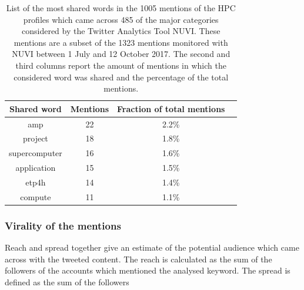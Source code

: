 \begin{table}[t]
 \begin{center}
  \begin{tabular}{cccc}
   \hline 
   \hline
   Shared word & Mentions & Fraction of total mentions \\ 
   \hline
   \hline
   amp & 22 & 2.2\% \\
   project & 18 & 1.8\% \\
   supercomputer & 16 & 1.6\% \\
   application & 15 & 1.5\% \\
   etp4h & 14 & 1.4\% \\
   compute & 11 & 1.1\% \\
   \hline
   \hline
  \end{tabular}
 \end{center} 
 \caption{List of the most shared words in the 1005 mentions of the HPC profiles which came across 485 of the major categories considered by the Twitter Analytics Tool NUVI. These mentions are a subset of the 1323 mentions monitored with NUVI between 1 July and 12 October 2017. The second and third columns report the amount of mentions in which the considered word was shared and the percentage of the total mentions. }
\label{Most_shared_words} 
\end{table}

\subsubsection{Virality of the mentions}
Reach and spread together give an estimate of the potential audience which came across with the tweeted content. The reach is calculated as the sum of the followers of the accounts which mentioned the analysed keyword. The spread is defined as the sum of the followers

